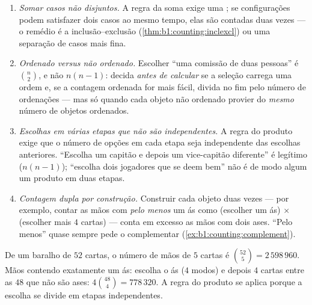 \begin{remark}\label{rem:b1:counting:pitfalls}
\begin{enumerate}
  \item \emph{Somar casos não disjuntos.} A regra da soma exige uma
        ; se configurações podem satisfazer dois casos ao
        mesmo tempo, elas são contadas duas vezes --- o remédio é a
        inclusão--exclusão (\cref{thm:b1:counting:inclexcl}) ou
        uma separação de casos mais fina.
  \item \emph{Ordenado versus não ordenado.} Escolher ``uma comissão de
        duas pessoas'' é $\binom n2$, e não $n(n-1)$: decida \emph{antes de
        calcular} se a seleção carrega uma ordem e, se a contagem
        ordenada for mais fácil, divida no fim pelo número de
        ordenações --- mas só quando cada objeto não ordenado provier
        do \emph{mesmo} número de objetos ordenados.
  \item \emph{Escolhas em várias etapas que não são independentes.}
        A regra do produto exige que o número de opções em cada etapa
        seja independente das escolhas anteriores. ``Escolha um
        capitão e depois um vice-capitão diferente'' é legítimo
        ($n(n-1)$); ``escolha dois jogadores que se deem bem'' não é
        de modo algum um produto em duas etapas.
  \item \emph{Contagem dupla por construção.} Construir cada objeto
        duas vezes --- por exemplo, contar as mãos com \emph{pelo
        menos} um ás como (escolher um ás) $\times$ (escolher mais $4$
        cartas) --- conta em excesso as mãos com dois ases. ``Pelo
        menos'' quase sempre pede o complementar
        (\cref{ex:b1:counting:complement}).
\end{enumerate}
\end{remark}

\begin{example}\label{ex:b1:counting:poker}
De um baralho de $52$ cartas, o número de mãos de $5$ cartas é
$\binom{52}{5} = 2\,598\,960$. Mãos contendo exatamente um ás:
escolha o ás ($4$ modos) e depois $4$ cartas entre as $48$ que não são
ases: $4 \binom{48}{4} = 778\,320$. A regra do produto se aplica porque a
escolha se divide em etapas independentes.
\end{example}

